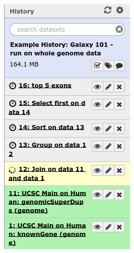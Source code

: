 \documentclass{beamer}              %
\begin{document}
\begin{frame}
\begin{columns}[T]
\begin{column}{.18\textwidth}
		\includegraphics[width=\textwidth,right]{figures/101p_04a.png}
    \end{column}
  \end{columns}
\end{frame}
\end{document}
